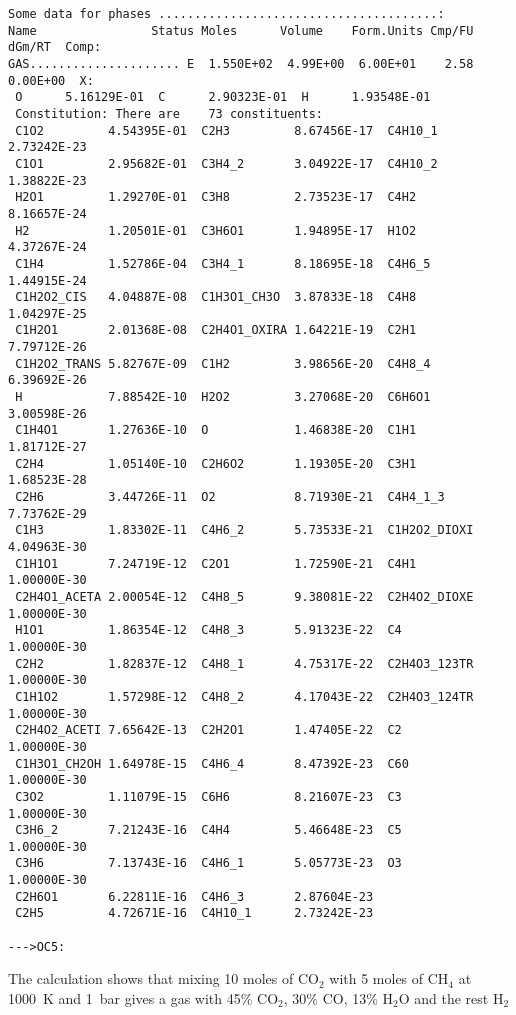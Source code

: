 \documentclass[11pt]{article}
\begin{document}
{\begin{verbatim}
Some data for phases .......................................:
Name                Status Moles      Volume    Form.Units Cmp/FU dGm/RT  Comp:
GAS..................... E  1.550E+02  4.99E+00  6.00E+01    2.58  0.00E+00  X:
 O      5.16129E-01  C      2.90323E-01  H      1.93548E-01
 Constitution: There are    73 constituents:
 C1O2         4.54395E-01  C2H3         8.67456E-17  C4H10_1      2.73242E-23
 C1O1         2.95682E-01  C3H4_2       3.04922E-17  C4H10_2      1.38822E-23
 H2O1         1.29270E-01  C3H8         2.73523E-17  C4H2         8.16657E-24
 H2           1.20501E-01  C3H6O1       1.94895E-17  H1O2         4.37267E-24
 C1H4         1.52786E-04  C3H4_1       8.18695E-18  C4H6_5       1.44915E-24
 C1H2O2_CIS   4.04887E-08  C1H3O1_CH3O  3.87833E-18  C4H8         1.04297E-25
 C1H2O1       2.01368E-08  C2H4O1_OXIRA 1.64221E-19  C2H1         7.79712E-26
 C1H2O2_TRANS 5.82767E-09  C1H2         3.98656E-20  C4H8_4       6.39692E-26
 H            7.88542E-10  H2O2         3.27068E-20  C6H6O1       3.00598E-26
 C1H4O1       1.27636E-10  O            1.46838E-20  C1H1         1.81712E-27
 C2H4         1.05140E-10  C2H6O2       1.19305E-20  C3H1         1.68523E-28
 C2H6         3.44726E-11  O2           8.71930E-21  C4H4_1_3     7.73762E-29
 C1H3         1.83302E-11  C4H6_2       5.73533E-21  C1H2O2_DIOXI 4.04963E-30
 C1H1O1       7.24719E-12  C2O1         1.72590E-21  C4H1         1.00000E-30
 C2H4O1_ACETA 2.00054E-12  C4H8_5       9.38081E-22  C2H4O2_DIOXE 1.00000E-30
 H1O1         1.86354E-12  C4H8_3       5.91323E-22  C4           1.00000E-30
 C2H2         1.82837E-12  C4H8_1       4.75317E-22  C2H4O3_123TR 1.00000E-30
 C1H1O2       1.57298E-12  C4H8_2       4.17043E-22  C2H4O3_124TR 1.00000E-30
 C2H4O2_ACETI 7.65642E-13  C2H2O1       1.47405E-22  C2           1.00000E-30
 C1H3O1_CH2OH 1.64978E-15  C4H6_4       8.47392E-23  C60          1.00000E-30
 C3O2         1.11079E-15  C6H6         8.21607E-23  C3           1.00000E-30
 C3H6_2       7.21243E-16  C4H4         5.46648E-23  C5           1.00000E-30
 C3H6         7.13743E-16  C4H6_1       5.05773E-23  O3           1.00000E-30
 C2H6O1       6.22811E-16  C4H6_3       2.87604E-23
 C2H5         4.72671E-16  C4H10_1      2.73242E-23

--->OC5:
\end{verbatim}
}

The calculation shows that mixing 10 moles of CO$_2$ with 5 moles of
CH$_4$ at 1000~K and 1~bar gives a gas with 45\% CO$_2$, 30\% CO, 13\%
H$_2$O and the rest H$_2$

\hypertarget{Set interactive}{}
\end{document}
